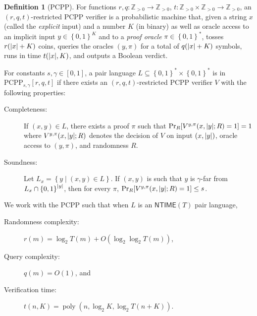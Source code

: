 \documentclass[10pt,a4paper]{article}
\theoremstyle{plain}
\theoremstyle{definition}
\newtheorem{definition}[theorem]{Definition}
\newcommand {\set} [1] {\ensuremath{ \left\lbrace #1 \right\rbrace }}
\DeclarePairedDelimiter{\abs}{\lvert}{\rvert}
\newcommand{\poly} {\ensuremath{\operatorname{poly}}}
\newcommand{\1}{\mathbb{1}} %
\newcommand{\bZ}{\mathbb{Z}}
\newcommand{\PCPP}{\mathrm{PCPP}}
\begin{document}
\begin{definition}[PCPP]
    \label{def:pcpp}
    For functions $r, q: \bZ_{>0} \to \bZ_{>0}$, $t: \bZ_{>0} \times \bZ_{>0} \to \bZ_{>0}$,
    an $(r,q,t)$-restricted $\PCPP$ verifier is a probabilistic machine that, given a string $x$
    (called the \emph{explicit} input) and a number $K$ (in binary) as well as oracle access to an implicit input $y \in \set{0,1}^K$ and to a \emph{proof oracle} $\pi \in \set{0,1}^*$,
    tosses $r(\abs{x}+K)$ coins, queries the oracles $(y,\pi)$ for a total of $q(\abs{x}+K)$ symbols,
    runs in time $t(\abs{x}, K)$, and outputs a Boolean verdict.
    
    For constants $s,\gamma \in [0,1]$, a pair language $L \subseteq \set{0,1}^\ast \times \set{0,1}^\ast$ is in $\PCPP_{s,\gamma}[r,q,t]$  if there exists an $(r,q,t)$-restricted $\PCPP$
    verifier $V$ with the following properties:
    \begin{description}
        \item[Completeness:] If $(x,y) \in L$, there exists a proof $\pi$ such that 
        $\Pr_R[V^{y,\pi}(x, \abs{y};R) = 1] = 1$ where $V^{y,\pi}(x, \abs{y};R)$ denotes the decision of $V$
        on input $(x, \abs{y})$, oracle access to $(y, \pi)$, and randomness $R$.
        \item[Soundness:] Let $L_x = \set{y \mid (x,y) \in L}$. If $(x,y)$ is such that $y$ is $\gamma$-far from $L_x \cap \set{0,1}^{\abs{y}}$, then for every $\pi$, $\Pr_R[V^{y,\pi}(x, \abs{y};R) = 1] \leq s$.
    \end{description}
\end{definition}
We work with the $\PCPP$ such that when $L$ is an $\mathsf{NTIME}(T)$ pair language,
\begin{description}
    \item[Randomness complexity:] $r(m) = \log_2T(m) + O(\log_2\log_2 T(m))$,
    \item[Query complexity:] $q(m) = O(1)$, and 
    \item[Verification time:] $t(n, K) = \poly(n , \log_2 K, \log_2 T(n+K))$.
\end{description}
\end{document}
